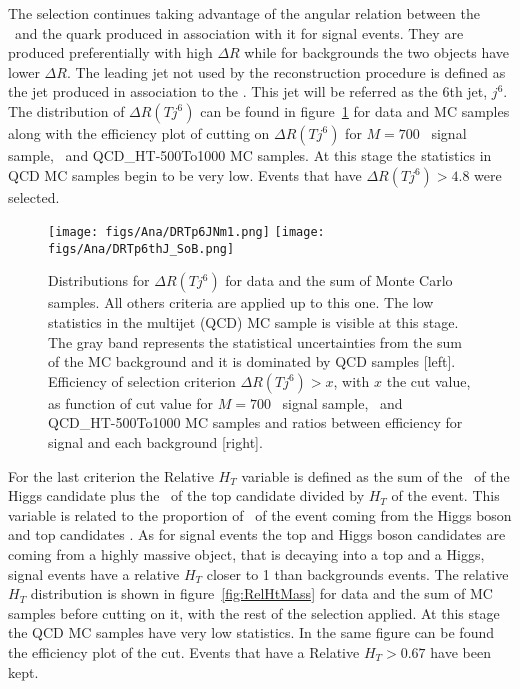 The selection continues taking advantage of the angular relation between the \Tp~and the quark produced in association with it for signal events. They are produced preferentially with high $\Delta R$ while for backgrounds the two objects have lower $\Delta R$. The leading jet not used by the reconstruction procedure is defined as the jet produced in association to the \Tp. This jet will be referred as the 6th jet, $j^{6}$. The distribution of $\Delta R (T j^{6})$ can be found in figure~\ref{fig:jet6} for data and MC samples along with the efficiency plot of cutting on $\Delta R (T j^{6})$ for $M=700$ \GeVcc~signal sample, \ttbar~and QCD\_HT-500To1000 MC samples. At this stage the statistics in QCD MC samples begin to be very low. Events that have $\Delta R (T j^{6})>4.8$ were selected. 

\begin{figure}[!Hhtbp]
  \begin{center}
    \texttt{[image: figs/Ana/DRTp6JNm1.png]}
    \texttt{[image: figs/Ana/DRTp6thJ\_SoB.png]}
    \caption{Distributions for $\Delta R (T j^{6})$  for data and the sum of Monte Carlo samples. All others criteria are applied up to this one. The low statistics in the multijet (QCD) MC sample is visible at this stage. The gray band represents the statistical uncertainties from the sum of the MC background and it is dominated by QCD samples [left]. Efficiency of selection criterion $\Delta R (T j^{6})>x$, with $x$ the cut value, as function of cut value for $M=700$ \GeVcc~signal sample, \ttbar~and QCD\_HT-500To1000 MC samples and ratios between efficiency for signal and each background [right].}
    \label{fig:jet6}
  \end{center}
\end{figure}

For the last criterion the Relative $H_{T}$ variable is defined as the sum of the \pt~of the Higgs candidate plus the \pt~of the top candidate divided by $H_{T}$ of the event. This variable is related to the proportion of \HT~of the event coming from the Higgs boson and top candidates \pt. As for signal events the top and Higgs boson candidates are coming from a highly massive object, that is decaying into a top and a Higgs, signal events have a relative $H_{T}$ closer to 1 than backgrounds events. The relative $H_{T}$ distribution is shown in figure~\ref{fig:RelHtMass} for data and the sum of MC samples before cutting on it, with the rest of the selection applied. At this stage the QCD MC samples have very low statistics. In the same figure can be found the efficiency plot of the cut. Events that have a Relative $H_{T}>0.67$ have been kept. 

